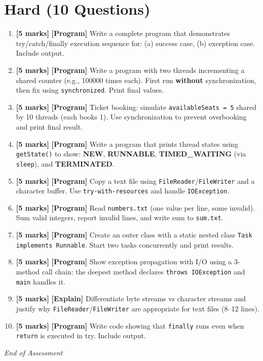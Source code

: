\documentclass[11pt,a4paper]{article}
\newcommand{\HMarks}{\textbf{[5 marks]} }
\begin{document}
\section*{Hard (10 Questions)}
\begin{enumerate}[label=\textbf{H\arabic*.}, leftmargin=*]
  \item \HMarks \textbf{[Program]} Write a complete program that demonstrates try/catch/finally execution sequence for:
    (a) success case, (b) exception case. Include output.

  \item \HMarks \textbf{[Program]} Write a program with two threads incrementing a shared counter (e.g., 100000 times each).
    First run \textbf{without} synchronization, then fix using \texttt{synchronized}. Print final values.

  \item \HMarks \textbf{[Program]} Ticket booking: simulate \texttt{availableSeats = 5} shared by 10 threads (each books 1).
    Use synchronization to prevent overbooking and print final result.

  \item \HMarks \textbf{[Program]} Write a program that prints thread states using \texttt{getState()} to show:
    \textbf{NEW}, \textbf{RUNNABLE}, \textbf{TIMED\_WAITING} (via \texttt{sleep}), and \textbf{TERMINATED}.

  \item \HMarks \textbf{[Program]} Copy a text file using \texttt{FileReader}/\texttt{FileWriter} and a character buffer.
    Use \texttt{try-with-resources} and handle \texttt{IOException}.

  \item \HMarks \textbf{[Program]} Read \texttt{numbers.txt} (one value per line, some invalid).
    Sum valid integers, report invalid lines, and write sum to \texttt{sum.txt}.

  \item \HMarks \textbf{[Program]} Create an outer class with a static nested class \texttt{Task implements Runnable}.
    Start two tasks concurrently and print results.

  \item \HMarks \textbf{[Program]} Show exception propagation with I/O using a 3-method call chain:
    the deepest method declares \texttt{throws IOException} and \texttt{main} handles it.

  \item \HMarks \textbf{[Explain]} Differentiate byte streams vs character streams and justify why
    \texttt{FileReader}/\texttt{FileWriter} are appropriate for text files (8--12 lines).

  \item \HMarks \textbf{[Program]} Write code showing that \texttt{finally} runs even when \texttt{return} is executed in try.
    Include output.
\end{enumerate}

\vfill
\noindent\textit{End of Assessment}
\end{document}
